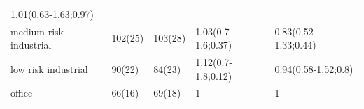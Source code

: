 \begin{longtable}[]{@{}lllll@{}}
\begin{minipage}[t]{0.23\columnwidth}
1.01(0.63-1.63;0.97)\strut
\end{minipage}\tabularnewline
\begin{minipage}[t]{0.20\columnwidth}\raggedright
medium risk industrial\strut
\end{minipage} & \begin{minipage}[t]{0.08\columnwidth}\raggedright
102(25)\strut
\end{minipage} & \begin{minipage}[t]{0.10\columnwidth}\raggedright
103(28)\strut
\end{minipage} & \begin{minipage}[t]{0.24\columnwidth}\raggedright
1.03(0.7-1.6;0.37)\strut
\end{minipage} & \begin{minipage}[t]{0.23\columnwidth}\raggedright
0.83(0.52-1.33;0.44)\strut
\end{minipage}\tabularnewline
\begin{minipage}[t]{0.20\columnwidth}\raggedright
low risk industrial\strut
\end{minipage} & \begin{minipage}[t]{0.08\columnwidth}\raggedright
90(22)\strut
\end{minipage} & \begin{minipage}[t]{0.10\columnwidth}\raggedright
84(23)\strut
\end{minipage} & \begin{minipage}[t]{0.24\columnwidth}\raggedright
1.12(0.7-1.8;0.12)\strut
\end{minipage} & \begin{minipage}[t]{0.23\columnwidth}\raggedright
0.94(0.58-1.52;0.8)\strut
\end{minipage}\tabularnewline
\begin{minipage}[t]{0.20\columnwidth}\raggedright
office\strut
\end{minipage} & \begin{minipage}[t]{0.08\columnwidth}\raggedright
66(16)\strut
\end{minipage} & \begin{minipage}[t]{0.10\columnwidth}\raggedright
69(18)\strut
\end{minipage} & \begin{minipage}[t]{0.24\columnwidth}\raggedright
1\strut
\end{minipage} & \begin{minipage}[t]{0.23\columnwidth}\raggedright
1\strut
\end{minipage}\tabularnewline
\bottomrule
\end{longtable}

